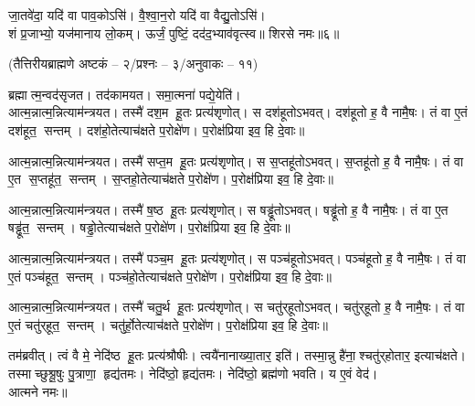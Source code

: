 जा॒तवे॑दा॒ यदि॑ वा पाव॒कोऽसि॑। वै॒श्वा॒न॒रो यदि॑ वा वैद्यु॒तोऽसि॑।\\
शं प्र॒जाभ्यो॒ यज॑मानाय लो॒कम्। ऊर्जं॒ पुष्टिं॒ दद॑द॒भ्याव॑वृत्स्व॥ शिरसे नमः॥६॥

{\small \closesection}

\centerline{\normalsize (तैत्तिरीयब्राह्मणे अष्टकं – २/प्रश्नः – ३/अनुवाकः – ११)}

ब्रह्मात्म॒न्वद॑सृजत। तद॑कामयत। समा॒त्मना॑ पद्ये॒येति॑।\\
आत्म॒न्नात्म॒न्नित्याम॑न्त्रयत। तस्मै॑ दश॒म हू॒तः प्रत्य॑शृणोत्। स दश॑हूतोऽभवत्। दश॑हूतो ह॒ वै नामै॒षः। तं वा ए॒तं दश॑हूत॒ सन्तम्। दश॑हो॒तेत्याच॑क्षते प॒रोक्षे॑ण। प॒रोक्ष॑प्रिया इव॒ हि दे॒वाः॥

आत्म॒न्नात्म॒न्नित्याम॑न्त्रयत। तस्मै॑ सप्त॒म हू॒तः प्रत्य॑शृणोत्। स स॒प्तहू॑तोऽभवत्। स॒प्तहू॑तो ह॒ वै नामै॒षः। तं वा ए॒त स॒प्तहू॑त॒ सन्तम्। स॒प्तहो॒तेत्याच॑क्षते प॒रोक्षे॑ण। प॒रोक्ष॑प्रिया इव॒ हि दे॒वाः॥

आत्म॒न्नात्म॒न्नित्याम॑न्त्रयत। तस्मै॑ ष॒ष्ठ हू॒तः प्रत्य॑शृणोत्। स षड्ढू॑तोऽभवत्। षड्ढू॑तो ह॒ वै नामै॒षः। तं वा ए॒त षड्ढू॑त॒ सन्तम्। षड्ढो॒तेत्याच॑क्षते प॒रोक्षे॑ण। प॒रोक्ष॑प्रिया इव॒ हि दे॒वाः॥

आत्म॒न्नात्म॒न्नित्याम॑न्त्रयत। तस्मै॑ पञ्च॒म हू॒तः प्रत्य॑शृणोत्। स पञ्च॑हूतोऽभवत्। पञ्च॑हूतो ह॒ वै नामै॒षः। तं वा ए॒तं पञ्च॑हूत॒ सन्तम्। पञ्च॑हो॒तेत्याच॑क्षते प॒रोक्षे॑ण। प॒रोक्ष॑प्रिया इव॒ हि दे॒वाः॥

आत्म॒न्नात्म॒न्नित्याम॑न्त्रयत। तस्मै॑ चतु॒र्थ हू॒तः प्रत्य॑शृणोत्। स चतु॑र्‌हूतोऽभवत्। चतु॑र्‌हूतो ह॒ वै नामै॒षः। तं वा ए॒तं चतु॑र्‌हूत॒ सन्तम्। चतु॑र्हो॒तेत्याच॑क्षते प॒रोक्षे॑ण। प॒रोक्ष॑प्रिया इव॒ हि दे॒वाः॥

तम॑ब्रवीत्। त्वं वै मे॒ नेदि॑ष्ठ हू॒तः प्रत्य॑श्रौषीः। त्वयै॑नानाख्या॒तार॒ इति॑। तस्मा॒न्नु है॑ना॒श्चतु॑र्‌होतार॒ इत्याच॑क्षते। तस्माच्छुश्रू॒षुः पु॒त्राणा॒ हृद्य॑तमः। नेदि॑ष्ठो॒ हृद्य॑तमः। नेदि॑ष्ठो॒ ब्रह्म॑णो भवति। य ए॒वं वेद॑।\\
आत्मने नमः॥


\newcommand{\ssankalpa}[1]{\refstepcounter{ssk} 
#1तन्मे॒ मन॑ शि॒वस॑ङ्क॒ल्पम॑स्तु॥\devanumber{\arabic{ssk}}॥}
\newcommand{\ssankalpaalign}[2]{
\setcounter{shlokacount}{\value{ssk}}
\twolineshloka{#1}{#2तन्मे॒ मन॑ शि॒वस॑ङ्क॒ल्पम॑स्तु}
\refstepcounter{ssk}
\pagebreak[0]}

